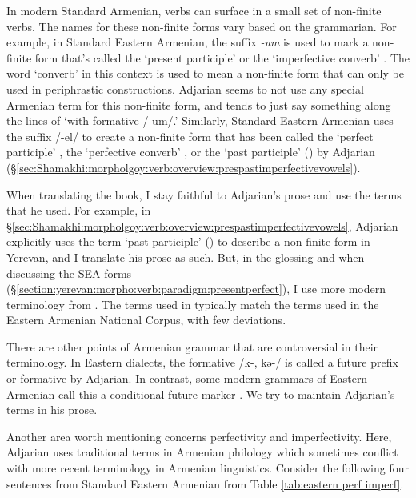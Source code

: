 In modern Standard Armenian, verbs can surface in a small set of non-finite verbs. The names for these non-finite forms vary based on the grammarian. For example, in Standard Eastern Armenian, the suffix \textit{-um} is used to mark a non-finite form that's called the `present participle' \citep[212]{DumTragut-2009-ArmenianReferenceGrammar} or the `imperfective converb' \citep[109]{DolatianEtAl-prep-IranianGrammar}. The word `converb' in this context is used to mean a non-finite form that can only be used in periphrastic constructions. Adjarian seems to not use any special Armenian term for this non-finite form, and tends to just say something along the lines of `with formative /-um/.'  Similarly, Standard Eastern Armenian uses the suffix /-el/ to create a non-finite form  that has been called the `perfect participle' \citep[213]{DumTragut-2009-ArmenianReferenceGrammar}, the `perfective converb' \citep[111]{DolatianEtAl-prep-IranianGrammar}, or the `past participle' ()  by Adjarian (\S\ref{sec:Shamakhi:morpholgoy:verb:overview:prespastimperfectivevowels}). 

When translating the book, I stay faithful to Adjarian's prose and use the terms that he used. For example, in \S\ref{sec:Shamakhi:morpholgoy:verb:overview:prespastimperfectivevowels}, Adjarian explicitly uses the term `past participle' ()  to describe a non-finite form in Yerevan, and I translate his prose as such. But, in the glossing and when discussing the SEA forms (\S\ref{section:yerevan:morpho:verb:paradigm:presentperfect}), I use more modern terminology from \citet{DolatianEtAl-prep-IranianGrammar}. The terms used in \citet{DolatianEtAl-prep-IranianGrammar} typically match the terms used in the Eastern Armenian National Corpus, with few deviations. 

There are other points of Armenian grammar that are controversial in their terminology. In Eastern dialects, the formative /k-, kə-/ is called a future prefix or formative by Adjarian. In contrast, some modern grammars of Eastern Armenian  call this a conditional future marker \citep[253ff]{DumTragut-2009-ArmenianReferenceGrammar}. We try to maintain Adjarian's terms in his prose. 

Another area worth mentioning concerns perfectivity and imperfectivity. Here, Adjarian uses traditional terms in Armenian philology which sometimes conflict  with more recent terminology in Armenian linguistics. Consider the following four sentences from Standard Eastern Armenian from Table \ref{tab:eastern perf imperf}. 

